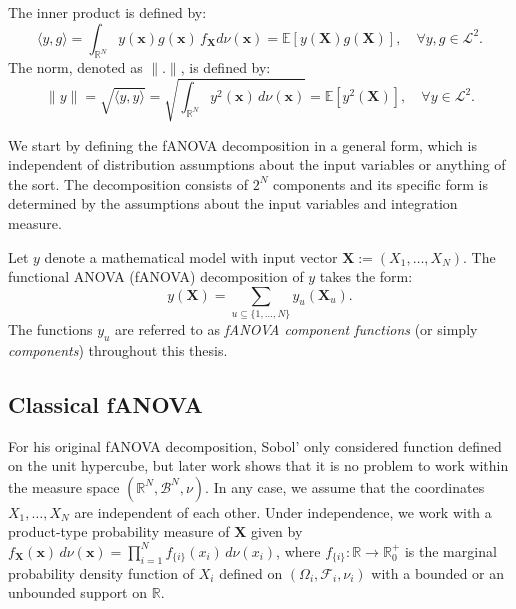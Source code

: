 The inner product is defined by:
\[
\langle y, g \rangle = \int_{\mathbb{R}^N} y(\boldsymbol{x}) g(\boldsymbol{x}) \, f_{\boldsymbol{X}}d\nu(\boldsymbol{x}) = \mathbb{E}[y(\boldsymbol{X})g(\boldsymbol{X})], \quad \forall y,g \in \mathcal{L}^2.
\]
The norm, denoted as $\|.\|$, is defined by:
\[
\|y\| = \sqrt{\langle y, y \rangle} = \sqrt{\int_{\mathbb{R}^N} y^2(\boldsymbol{x}) \, d\nu(\boldsymbol{x})} = \mathbb{E}[y^2(\boldsymbol{X})], \quad \forall y \in \mathcal{L}^2.
\]

We start by defining the fANOVA decomposition in a general form, which is independent of distribution assumptions about the input variables or anything of the sort. The decomposition consists of $2^N$ components and its specific form is determined by the assumptions about the input variables and integration measure.

\begin{definition}\label{def:fanova_decomposition}
Let $y$ denote a mathematical model with input vector $\boldsymbol{X} := (X_1, \dots, X_N)$. 
The functional ANOVA (fANOVA) decomposition of $y$ takes the form:
\begin{equation}
    y(\boldsymbol{X}) = \sum_{u \subseteq \{1, \dots, N\}} y_{u}(\boldsymbol{X}_u).
\end{equation}
The functions $y_u$ are referred to as \emph{fANOVA component functions} 
(or simply \emph{components}) throughout this thesis.
\end{definition}



\subsection{Classical fANOVA}
For his original fANOVA decomposition, Sobol' only considered function defined on the unit hypercube, but later work shows that it is no problem to work within the measure space $(\mathbb{R}^N, \mathcal{B}^N, \nu)$.
In any case, we assume that the coordinates $X_1, \dots , X_N$ are independent of each other.
Under independence, we work with a product-type probability measure of $\boldsymbol{X}$ given by \(f_{\boldsymbol{X}}(\boldsymbol{x}) \, d\nu(\boldsymbol{x}) = \prod_{i=1}^{N} f_{\{i\}}(x_i) \, d\nu(x_i)\), where \(f_{\{i\}}: \mathbb{R} \rightarrow \mathbb{R}_{0}^{+}\) is the marginal probability density function of \(X_i\) defined on $(\Omega_i, \mathcal{F}_i, \nu_i)$ with a bounded or an unbounded support on $\mathbb{R}$.

